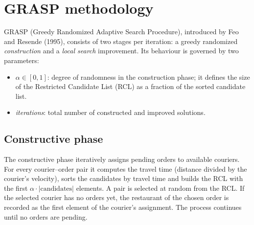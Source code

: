 \documentclass[11pt]{article}
\begin{document}
\section{GRASP methodology}

GRASP (Greedy Randomized Adaptive Search Procedure), introduced by Feo and
Resende (1995), consists of two stages per iteration: a greedy randomized
\emph{construction} and a \emph{local search} improvement. Its behaviour is
governed by two parameters:
\begin{itemize}
  \item $\alpha \in [0,1]$: degree of randomness in the construction phase; it
        defines the size of the Restricted Candidate List (RCL) as a fraction
        of the sorted candidate list.
  \item \textit{iterations}: total number of constructed and improved
        solutions.
\end{itemize}

\subsection{Constructive phase}

The constructive phase iteratively assigns pending orders to available
couriers. For every courier--order pair it computes the travel time (distance
divided by the courier's velocity), sorts the candidates by travel time and
builds the RCL with the first $\alpha \cdot |\text{candidates}|$ elements. A
pair is selected at random from the RCL. If the selected courier has no orders
yet, the restaurant of the chosen order is recorded as the first element of the
courier's assignment. The process continues until no orders are pending.
\end{document}
